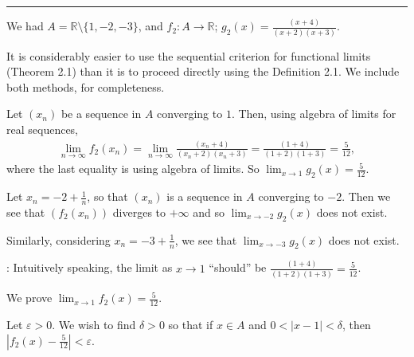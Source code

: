 \documentclass[letterpaper,10pt,english]{jupyterBook}
\begin{document}
\bigskip\hrule\bigskip


\sphinxAtStartPar
{\hyperref[\detokenize{Problems:id4}]{}} We had \(A= \mathbb{R} \setminus \{1, -2, -3\}\), and \(f_2:A\to\mathbb{R}\); \(\displaystyle g_{2}(x)= \frac{(x + 4)}{(x + 2)(x + 3)}\).

\sphinxAtStartPar
It is considerably easier to use the sequential criterion for functional limits (Theorem 2.1) than it is to proceed directly using the Definition 2.1. We include both methods, for completeness.

\sphinxAtStartPar
{} 
Let \((x_n)\) be a sequence in \(A\) converging to \(1\). Then, using algebra of limits for real sequences,
\begin{equation*}
\begin{split}
\lim_{n\to\infty}f_2(x_n)= \lim_{n\to\infty} \frac{(x_n + 4)}{(x_n + 2)(x_n + 3)} =  \frac{(1 + 4)}{(1 + 2)(1 + 3)} = \frac{5}{12},
\end{split}
\end{equation*}
\sphinxAtStartPar
where the last equality is using algebra of limits. So \(\displaystyle\lim_{x \rightarrow 1}g_{2}(x) = \frac{5}{12}\).

\sphinxAtStartPar
Let \(x_n=-2 + \frac{1}{n}\), so that \((x_n)\) is a sequence in \(A\) converging to \(-2\). Then we see that \((f_2(x_n))\) diverges to \(+\infty\) and so \(\lim_{x \rightarrow -2}g_{2}(x)\)  does not exist.

\sphinxAtStartPar
Similarly, considering \(x_n=-3 + \frac{1}{n}\),  we see that \(\lim_{x \rightarrow -3}g_{2}(x)\) does not exist.

\sphinxAtStartPar
{}: 
Intuitively speaking, the limit as \(x\rightarrow 1\) “should” be \(\frac{(1 + 4)}{(1 + 2)(1 + 3)}=\frac{5}{12}\).

\sphinxAtStartPar
We prove \(\lim_{x\rightarrow 1}f_2(x) = \frac{5}{12}\).

\sphinxAtStartPar
Let \(\varepsilon>0\). We wish to find \(\delta>0\) so that if \(x\in A\) and \(0<|x-1|<\delta\), then \(\left|f_2(x)-\frac{5}{12}\right| <\varepsilon\).
\end{document}
